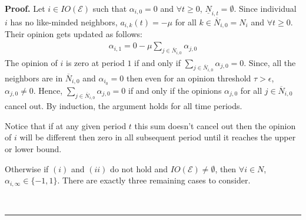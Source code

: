 \documentclass{article}
\newenvironment{proof}[1][Proof]{\textbf{#1.} }{\ \rule{0.5em}{0.5em}}
\begin{document}
\noindent \begin{proof} 
Let $i \in {IO}(\mathcal{E})$ such that $\alpha_{i,0}=0$ and $\forall t\geq0$, $\underline{N}_{i,t} =\emptyset$. Since individual $i$ has no like-minded neighbors, $a_{i,k} (t) = - \mu$ for all $ k \in \overline{N}_{i,0} = N_i $ and $\forall t \geq 0$. Their opinion gets updated as follows:
\begin{align*}
\alpha_{i,1} = 0 - \mu \sum_{j \in \overline{N}_{i,0}} \alpha_{j,0}
\end{align*}
The opinion of $i$ is zero at period $1$ if and only if $\sum_{j \in \overline{N}_{i,0}} \alpha_{j,0}=0$. Since, all the neighbors are in $ \overline{N}_{i,0}$ and $\alpha_{i_0}=0$ then even for an opinion threshold $\tau>\epsilon$, $\alpha_{j,0} \neq 0$. Hence, $\sum_{j \in \overline{N}_{i,0}} \alpha_{j,0}=0$ if and only if the opinions $\alpha_{j,0}$ for all $j \in  \overline{N}_{i,0}$ cancel out. By induction, the argument holds for all time periods. 

Notice that if at any given period $t$ this sum doesn't cancel out then the opinion of $i$ will be different then zero in all subsequent period until it reaches the upper or lower bound. 

\bigskip

 Otherwise if $(i)$ and $(ii)$ do not hold and ${IO}(\mathcal{E}) \neq \emptyset$, then $ \forall i \in N$, $\alpha_{i,\infty} \in \{-1,1 \}$. There are exactly three remaining cases to consider. 




\end{proof}
\end{document}
